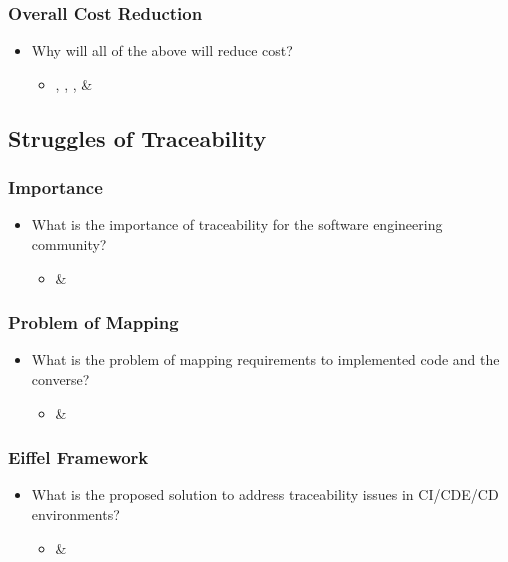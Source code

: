 \documentclass[12pt,a4paper]{article}
\begin{document}
        \subsubsection{Overall Cost Reduction}
        \begin{itemize}[noitemsep]
            \item Why will all of the above will reduce cost?
            \begin{itemize}
                \item \cite{atkinson_edwards_2018}, \cite{bosch_2014}, \cite{stackify_2018}, \& \cite{stahl_2017} \cite{stackify_2018}
            \end{itemize}
        \end{itemize}
        
    \subsection{Struggles of Traceability}
        \subsubsection{Importance}
        \begin{itemize}[noitemsep]
            \item What is the importance of traceability for the software engineering community?
            \begin{itemize}
                \item \cite{stahl_2017} \& \cite{stahl_hallen_bosch_2016}
            \end{itemize}
        \end{itemize}
        \subsubsection{Problem of Mapping}
        \begin{itemize}[noitemsep]
            \item What is the problem of mapping requirements to implemented code and the converse?
            \begin{itemize}
                \item \cite{stahl_2017} \& \cite{stahl_hallen_bosch_2016}
            \end{itemize}
        \end{itemize}
        \subsubsection{Eiffel Framework}
        \begin{itemize}[noitemsep]
            \item What is the proposed solution to address traceability issues in CI/CDE/CD environments?
            \begin{itemize}
                \item \cite{stahl_2017} \& \cite{stahl_hallen_bosch_2016}
            \end{itemize}
        \end{itemize}
        
\end{document}
